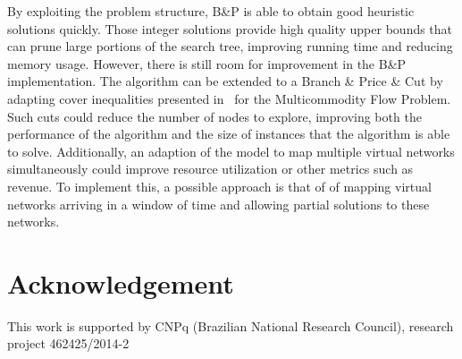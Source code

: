 \documentclass[conference]{IEEEtran}
\begin{document}
By exploiting the problem structure, B\&P is able to obtain good heuristic solutions quickly.
Those integer solutions provide high quality upper bounds that can prune large portions of the search tree, improving running time and reducing memory usage.
However, there is still room for improvement in the B\&P implementation.
The algorithm can be extended to a Branch \& Price \& Cut by adapting cover inequalities presented in~\cite{Barnhart:2000} for the Multicommodity Flow Problem.
Such cuts could reduce the number of nodes to explore, improving both the performance of the algorithm and the size of instances that the algorithm is able to solve.
Additionally, an adaption of the model to map multiple virtual networks simultaneously could improve resource utilization or other metrics such as revenue.
To implement this, a possible approach is that of \cite{Guerzoni:2014} of mapping virtual networks arriving in a window of time and allowing partial solutions to these networks.

\section*{Acknowledgement}
This work is supported by CNPq (Brazilian National Research Council), research project 462425/2014-2
\end{document}
